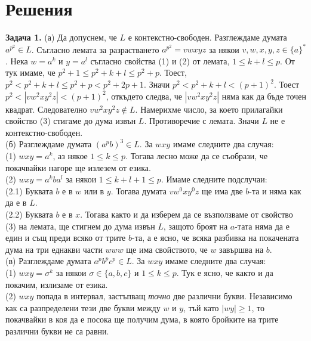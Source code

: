 \documentclass{article}
\begin{document}
\section{Решения}
    \textbf{Задача 1.} (а) Да допуснем, че $L$ е контекстно-свободен. 
    Разглеждаме думата $a^{p^2} \in L$. Съгласно лемата за 
    разрастването $a^{p^2} = vwxyz$ за някои $v,w,x,y,z \in \{a\}^*$. Нека
    $w = a^k$ и $y = a^l$ съгласно свойства (1) и (2) от лемата, $1 \leq k + l \leq p$.
    От тук имаме, че $p^2 + 1 \leq p^2 + k + l \leq p^2 + p$. Тоест, 
    $p^2 < p^2 + k + l \leq p^2 + p < p^2 + 2p + 1$. Значи 
    $p^2 < p^2 + k + l < (p+1)^2$. Тоест $p^2 < |vw^2xy^2z| < (p+1)^2$, откъдето
    следва, че $|vw^2xy^2z|$ няма как да бъде точен квадрат. Следователно
    $vw^2xy^2z \notin L$. Намерихме число, за което прилагайки свойство (3) стигаме
    до дума извън $L$. Противоречие с лемата. Значи $L$ не е контекстно-свободен. \\
    \vspace{5pt}
    (б) Разглеждаме думата $(a^pb)^3 \in L$. За $wxy$ имаме следните два случая: \\
    (1) $wxy = a^k$, аз някое $1 \leq k \leq p$. Тогава лесно може да се 
    съобрази, че покачвайки нагоре ще излезем от езика. \\
    (2) $wxy = a^kba^l$ за някои $1 \leq k + l + 1 \leq p$. Имаме следните 
    подслучаи: \\
    \hspace{15pt}(2.1) Буквата $b$ е в $w$ или в $y$. Тогава думата $vw^0xy^0z$ ще има
    две $b$-та и няма как да е в $L$. \\
    \hspace{15pt}(2.2) Буквата $b$ е в $x$. Тогава както и да изберем да се възползваме
    от свойство (3) на лемата, ще стигнем до дума извън $L$, защото броят на $a$-тата
    няма да е един и същ преди всяко от трите $b$-та, а е ясно, че всяка разбивка на
    покачената дума на три еднакви части $www$ ще има свойството, че $w$ завършва на 
    $b$.\\
    \vspace{5pt}
    (в) Разглеждаме думата $a^pb^pc^p \in L$. За $wxy$ имаме следните два случая: \\
    (1) $wxy = \sigma^k$ за някои $\sigma \in \{a,b,c\}$ и $1 \leq k \leq p$. Тук е 
    ясно, че както и да покачим, излизаме от езика. \\
    (2) $wxy$ попада в интервал, застъпващ \textit{точно} две различни букви. 
    Независимо как са разпределени тези две букви между $w$ и $y$, тъй като
    $|wy| \geq 1$, то покачвайки в коя да е посока ще получим дума, в която бройките
    на трите различни букви не са равни.
\end{document}
